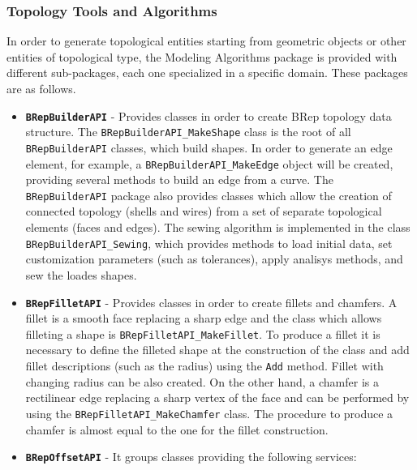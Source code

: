 \subsubsection{Topology Tools and Algorithms}

In order to generate topological entities starting from geometric objects or other entities of topological type, the Modeling Algorithms package is provided with different sub-packages, each one specialized in a specific domain. These packages are as follows.
%
\begin{itemize}
\renewcommand\labelitemi{\tiny$\blacksquare$}
\renewcommand\labelitemii{\tiny$\bullet$}
\item \textbf{\lstinline[language=Java]!BRepBuilderAPI!} - Provides classes in order to create \gls{BRep} topology data structure. The \lstinline[language=Java]!BRepBuilderAPI_MakeShape! class is the root of all \lstinline[language=Java]!BRepBuilderAPI! classes, which build shapes. In order to generate an edge element, for example, a \lstinline[language=Java]!BRepBuilderAPI_MakeEdge! object will be created, providing several methods to build an edge from a curve. The \lstinline[language=Java]!BRepBuilderAPI! package also provides classes which allow the creation of connected topology (shells and wires) from a set of separate topological elements (faces and edges). The sewing algorithm is implemented in the class \lstinline[language=Java]!BRepBuilderAPI_Sewing!, which provides methods to load initial data, set customization parameters (such as tolerances), apply analisys methods, and sew the loades shapes.
\item \textbf{\lstinline[language=Java]!BRepFilletAPI!} - Provides classes in order to create fillets and chamfers. A fillet is a smooth face replacing a sharp edge and the class which allows filleting a shape is \lstinline[language=Java]!BRepFilletAPI_MakeFillet!. To produce a fillet it is necessary to define the filleted shape at the construction of the class and add fillet descriptions (such as the radius) using the \lstinline[language=Java]!Add! method. Fillet with changing radius can be also created. On the other hand, a chamfer is a rectilinear edge replacing a sharp vertex of the face and can be performed by using the \lstinline[language=Java]!BRepFilletAPI_MakeChamfer! class. The procedure to produce a chamfer is almost equal to the one for the fillet construction.
\item \textbf{\lstinline[language=Java]!BRepOffsetAPI!} - It groups classes providing the following services:
	\begin{itemize}

\end{itemize}
\end{itemize}
